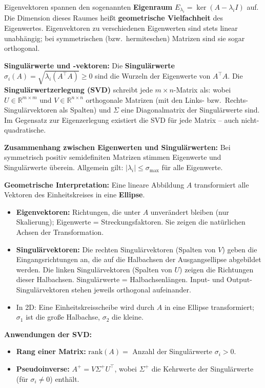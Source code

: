 Eigenvektoren spannen den sogenannten \textbf{Eigenraum} $E_{\lambda_i} = \ker(A - \lambda_i I)$ auf. Die Dimension dieses Raumes heißt \textbf{geometrische Vielfachheit} des Eigenwertes. Eigenvektoren zu verschiedenen Eigenwerten sind stets linear unabhängig; bei symmetrischen (bzw.\ hermiteschen) Matrizen sind sie sogar orthogonal.

\textbf{Singulärwerte und -vektoren:} Die \textbf{Singulärwerte} $\sigma_i(A) = \sqrt{\lambda_i(A^\top A)} \geq 0$ sind die Wurzeln der Eigenwerte von $A^\top A$. Die \textbf{Singulärwertzerlegung (SVD)} schreibt jede $m \times n$-Matrix als:
wobei $U \in \mathbb{R}^{m\times m}$ und $V \in \mathbb{R}^{n\times n}$ orthogonale Matrizen (mit den Links- bzw.\ Rechts-Singulärvektoren als Spalten) und $\Sigma$ eine Diagonalmatrix der Singulärwerte sind. Im Gegensatz zur Eigenzerlegung existiert die SVD für jede Matrix -- auch nicht-quadratische.

\textbf{Zusammenhang zwischen Eigenwerten und Singulärwerten:} Bei symmetrisch positiv semidefiniten Matrizen stimmen Eigenwerte und Singulärwerte überein. Allgemein gilt: $|\lambda_i| \leq \sigma_{\max}$ für alle Eigenwerte.

\textbf{Geometrische Interpretation:} Eine lineare Abbildung $A$ transformiert alle Vektoren des Einheitskreises in eine \textbf{Ellipse}.
\begin{itemize}[leftmargin=1.5em]
    \item \textbf{Eigenvektoren:} Richtungen, die unter $A$ unverändert bleiben (nur Skalierung); Eigenwerte = Streckungsfaktoren. Sie zeigen die natürlichen Achsen der Transformation.
    \item \textbf{Singulärvektoren:} Die rechten Singulärvektoren (Spalten von $V$) geben die Eingangsrichtungen an, die auf die Halbachsen der Ausgangsellipse abgebildet werden. Die linken Singulärvektoren (Spalten von $U$) zeigen die Richtungen dieser Halbachsen. Singulärwerte = Halbachsenlängen. Input- und Output-Singulärvektoren stehen jeweils orthogonal aufeinander.
    \item In 2D: Eine Einheitskreisscheibe wird durch $A$ in eine Ellipse transformiert; $\sigma_1$ ist die große Halbachse, $\sigma_2$ die kleine.
\end{itemize}

\textbf{Anwendungen der SVD:}
\begin{itemize}[leftmargin=1.5em]
    \item \textbf{Rang einer Matrix:} $\mathrm{rank}(A) = $ Anzahl der Singulärwerte $\sigma_i > 0$.
    \item \textbf{Pseudoinverse:} $A^+ = V \Sigma^+ U^\top$, wobei $\Sigma^+$ die Kehrwerte der Singulärwerte (für $\sigma_i \neq 0$) enthält.
\end{itemize}

